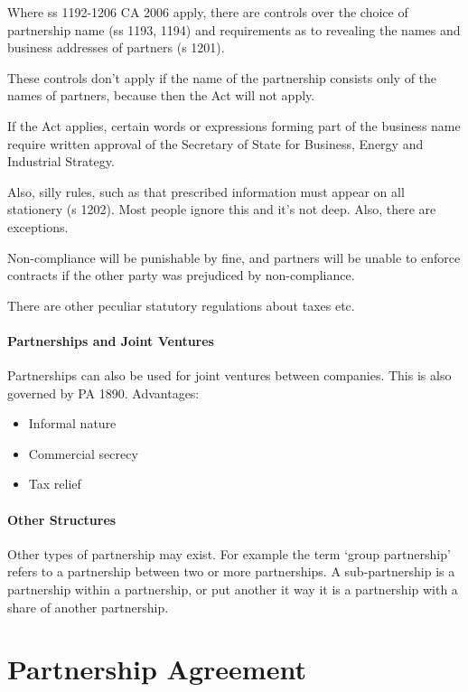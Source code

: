 \documentclass[
]{article}
\providecommand{\tightlist}{%
  \setlength{\itemsep}{0pt}\setlength{\parskip}{0pt}}
\begin{document}
Where ss 1192-1206 CA 2006 apply, there are controls over the choice of
partnership name (ss 1193, 1194) and requirements as to revealing the
names and business addresses of partners (s 1201).

These controls don't apply if the name of the partnership consists only
of the names of partners, because then the Act will not apply.

If the Act applies, certain words or expressions forming part of the
business name require written approval of the Secretary of State for
Business, Energy and Industrial Strategy.

Also, silly rules, such as that prescribed information must appear on
all stationery (s 1202). Most people ignore this and it's not deep.
Also, there are exceptions.

Non-compliance will be punishable by fine, and partners will be unable
to enforce contracts if the other party was prejudiced by
non-compliance.

There are other peculiar statutory regulations about taxes etc.

\hypertarget{partnerships-and-joint-ventures}{%
\paragraph{Partnerships and Joint
Ventures}\label{partnerships-and-joint-ventures}}

Partnerships can also be used for joint ventures between companies. This
is also governed by PA 1890. Advantages:

\begin{itemize}
\tightlist
\item
  Informal nature
\item
  Commercial secrecy
\item
  Tax relief
\end{itemize}

\hypertarget{other-structures}{%
\paragraph{Other Structures}\label{other-structures}}

Other types of partnership may exist. For example the term `group
partnership' refers to a partnership between two or more partnerships. A
sub-partnership is a partnership within a partnership, or put another it
way it is a partnership with a share of another partnership.

\hypertarget{partnership-agreement}{%
\section{Partnership Agreement}\label{partnership-agreement}}
\end{document}
